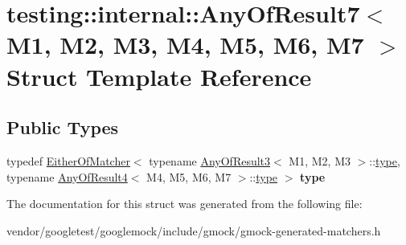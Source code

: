 \hypertarget{structtesting_1_1internal_1_1_any_of_result7}{}\section{testing\+:\+:internal\+:\+:Any\+Of\+Result7$<$ M1, M2, M3, M4, M5, M6, M7 $>$ Struct Template Reference}
\label{structtesting_1_1internal_1_1_any_of_result7}
\subsection*{Public Types}
\begin{DoxyCompactItemize}
\item 
\mbox{\label{structtesting_1_1internal_1_1_any_of_result7_a976873478921520833464a86f840abe8}} 
typedef \hyperlink{classtesting_1_1internal_1_1_either_of_matcher}{Either\+Of\+Matcher}$<$ typename \hyperlink{structtesting_1_1internal_1_1_any_of_result3}{Any\+Of\+Result3}$<$ M1, M2, M3 $>$\+::\hyperlink{classtesting_1_1internal_1_1_either_of_matcher}{type}, typename \hyperlink{structtesting_1_1internal_1_1_any_of_result4}{Any\+Of\+Result4}$<$ M4, M5, M6, M7 $>$\+::\hyperlink{classtesting_1_1internal_1_1_either_of_matcher}{type} $>$ {\bfseries type}
\end{DoxyCompactItemize}


The documentation for this struct was generated from the following file\+:\begin{DoxyCompactItemize}
\item 
vendor/googletest/googlemock/include/gmock/gmock-\/generated-\/matchers.\+h\end{DoxyCompactItemize}
